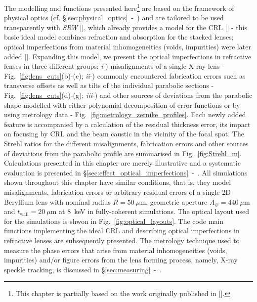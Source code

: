 \begin{refsection}
The modelling and functions presented here\footnote{This chapter is partially based on the work originally published in [\cite{Celestre2020b}].} are based on the framework of physical optics (cf. \S\ref{sec:physical_optics}~-~\textit{}) and are tailored to be used transparently with \textit{SRW} [\cite{Chubar1998}], which already provides a model for the CRL [\cite{Baltser2011}] - this basic ideal model combines refraction and absorption for the stacked lenses; optical imperfections from material inhomogeneities (voids, impurities) were later added [\cite{Roth2014}]. Expanding this model, we present the optical imperfections in refractive lenses in three different groups: \textit{i}-) misalignments of a single X-ray lens - Fig.~\ref{fig:lens_cuts}(b)-(c); \textit{ii}-) commonly encountered fabrication errors such as transverse offsets as well as tilts of the individual parabolic sections - Fig.~\ref{fig:lens_cuts}(d)-(g); \textit{iii}-) and other sources of deviations from the parabolic shape modelled with either polynomial decomposition of error functions or by using metrology data - Fig.~\ref{fig:metrology_zernike_profiles}. Each newly added feature is accompanied by a calculation of the residual thickness error, its impact on focusing by CRL and the beam caustic in the vicinity of the focal spot. The Strehl ratios for the different misalignments, fabrication errors and other sources of deviations from the parabolic profile are summarised in Fig.~\ref{fig:Strehl_m}. Calculations presented in this chapter are merely illustrative and a systematic evaluation is presented in \S\ref{sec:effect_optical_imperfections}~-~\textit{}. All simulations shown throughout this chapter have similar conditions, that is, they model misalignments, fabrication errors or arbitrary residual errors of a single 2D-Beryllium lens with nominal radius $R=50~\mu\text{m}$, geometric aperture $A_{\diameter}=440~\mu\text{m}$ and $t_\text{wall}=20~\mu$m at 8~keV in fully-coherent simulations. The optical layout used for the simulations is shwon in Fig.~\ref{fig:optical_layouts}. The code main functions implementing the ideal CRL and describing optical imperfections in refractive lenses are subsequently presented. The metrology technique used to measure the phase errors that arise from material inhomogeneities (voids, impurities) and/or figure errors from the lens forming process, namely, X-ray speckle tracking, is discussed in \S\ref{sec:measuring}~-~\textit{}.


\end{refsection}
